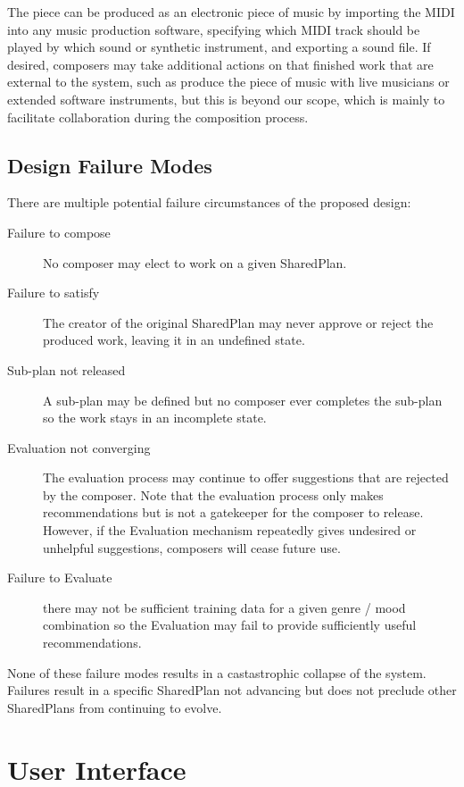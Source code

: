 \documentclass[final,authoryear,5p,times,twocolumn]{elsarticle}
\begin{document}
The piece can be produced as an electronic piece of music by importing the MIDI into any music production software, specifying which MIDI track should be played by which sound or synthetic instrument, and exporting a sound file. If desired, composers may take additional actions on that finished work that are external to the system, such as produce the piece of music with live musicians or extended software instruments, but this is beyond our scope, which is mainly to facilitate collaboration during the composition process.

\subsection{Design Failure Modes}

There are multiple potential failure circumstances of the proposed design:

\begin{description}
\item[Failure to compose] No composer may elect to work on a given SharedPlan.
\item[Failure to satisfy] The creator of the original SharedPlan may never approve or reject the produced work, leaving it in an undefined state.
\item[Sub-plan not released]A sub-plan may be defined but no composer ever completes the sub-plan so the work stays in an incomplete state.
\item[Evaluation not converging] The evaluation process may continue to offer suggestions that are rejected by the composer. Note that the evaluation process only makes recommendations but is not a gatekeeper for the composer to release. However, if the Evaluation mechanism repeatedly gives undesired or unhelpful suggestions, composers will cease future use.
\item[Failure to Evaluate] there may not be sufficient training data for a given genre / mood combination so the Evaluation may fail to provide sufficiently useful recommendations.
\end{description}

None of these failure modes results in a castastrophic collapse of the system. Failures result in a specific SharedPlan not advancing but does not preclude other SharedPlans from continuing to evolve.

\section{User Interface}
\end{document}
